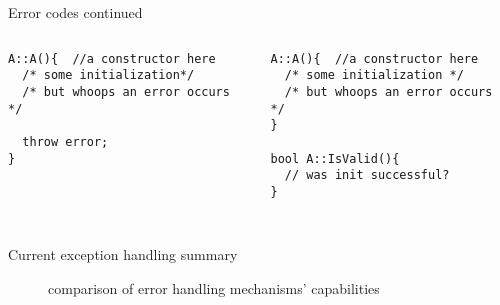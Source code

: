 \documentclass[10pt,a4paper]{beamer}
\begin{document}
\begin{frame}[fragile]{Error codes continued}

	\begin{columns}
		\begin{column}{0.48\linewidth}
			\begin{verbatim}
A::A(){  //a constructor here
  /* some initialization*/
  /* but whoops an error occurs */

  throw error; 
}
			\end{verbatim}
		\end{column}
	\pause
		\begin{column}{0.48\linewidth}
			\begin{verbatim}
A::A(){  //a constructor here
  /* some initialization */
  /* but whoops an error occurs */
}	

bool A::IsValid(){ 
  // was init successful?
} 
	
			\end{verbatim}
		\end{column}
	\end{columns}
\end{frame}
	
\begin{frame}{Current exception handling summary}
	\centering

	\begin{figure}
	
		\caption{comparison of error handling mechanisms' capabilities}	
	\end{figure}
	

\end{frame}
\end{document}
